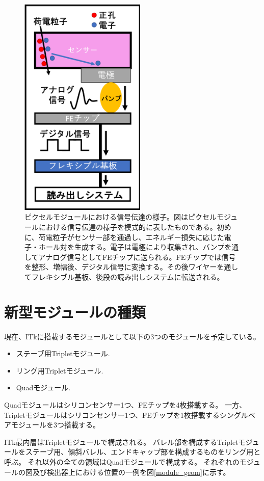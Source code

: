 \begin{figure}[bpt]\centering
\includegraphics[width=6cm]{./module_electric_overview.png}
\caption[ピクセルモジュールにおける信号伝達の様子]{ピクセルモジュールにおける信号伝達の様子。図はピクセルモジュールにおける信号伝達の様子を模式的に表したものである。初めに、荷電粒子がセンサー部を通過し、エネルギー損失に応じた電子・ホール対を生成する。電子は電極により収集され、バンプを通してアナログ信号としてFEチップに送られる。FEチップでは信号を整形、増幅後、デジタル信号に変換する。その後ワイヤーを通してフレキシブル基板、後段の読み出しシステムに転送される。}
\label{module_electric_overview}
\end{figure}

\clearpage
\section{新型モジュールの種類}
現在、ITkに搭載するモジュールとして以下の3つのモジュールを予定している。
\begin{itemize}
  \item ステーブ用Tripletモジュール.
  \item リング用Tripletモジュール.
  \item Quadモジュール.
\end{itemize}

Quadモジュールはシリコンセンサー1つ、FEチップを4枚搭載する。
一方、Tripletモジュールはシリコンセンサー1つ、FEチップを1枚搭載するシングルベアモジュールを3つ搭載する。

ITk最内層はTripletモジュールで構成される。
バレル部を構成するTripletモジュールをステーブ用、傾斜バレル、エンドキャップ部を構成するものをリング用と呼ぶ。
それ以外の全ての領域はQuadモジュールで構成する。
それぞれのモジュールの図及び検出器上における位置の一例を図\ref{module_geom}に示す。

